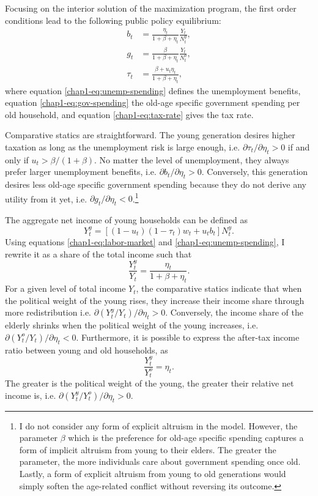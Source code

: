 Focusing on the interior solution of the maximization program, the first order conditions lead to the following public policy equilibrium:
\begin{align}
    b_t &= \frac{\eta_t}{1+\beta+\eta_t}\frac{Y_t}{N_t^y},\label{chap1-eq:unemp-spending}\\
    g_t &= \frac{\beta}{1+\beta+\eta_t}\frac{Y_t}{N_t^o},\label{chap1-eq:gov-spending}\\
    \tau_t &= \frac{\beta + u_t\eta_t}{1+\beta+\eta_t},\label{chap1-eq:tax-rate}
\end{align}
where equation \eqref{chap1-eq:unemp-spending} defines the unemployment benefits, equation \eqref{chap1-eq:gov-spending} the old-age specific government spending per old household, and equation \eqref{chap1-eq:tax-rate} gives the tax rate. 

Comparative statics are straightforward. The young generation desires higher taxation as long as the unemployment risk is large enough, i.e. $\partial \tau_t/\partial \eta_t > 0$ if and only if $u_t> \beta/(1+\beta)$. No matter the level of unemployment, they always prefer larger unemployment benefits, i.e. $\partial b_t/\partial \eta_t > 0$. Conversely, this generation desires less old-age specific government spending because they do not derive any utility from it yet, i.e. $\partial g_t/\partial \eta_t < 0$.\footnote{I do not consider any form of explicit altruism in the model. However, the parameter $\beta$ which is the preference for old-age specific spending captures a form of implicit altruism from young to their elders. The greater the parameter, the more individuals care about government spending once old.  Lastly, a form of explicit altruism from young to old generations would simply soften the age-related conflict without reversing its outcome.}

The aggregate net income of young households can be defined as
\begin{equation*}
    Y_t^y = \left[(1-u_t)(1-\tau_t)w_t + u_tb_t\right]N_t^y.
\end{equation*} Using equations \eqref{chap1-eq:labor-market} and \eqref{chap1-eq:unemp-spending}, I rewrite it as a share of the total income such that 
\begin{equation*}
    \frac{Y_t^y}{Y_t} = \frac{\eta_t}{1+\beta + \eta_t}.
\end{equation*}
For a given level of total income $Y_t$, the comparative statics indicate that when the political weight of the young rises, they increase their income share through more redistribution i.e. $\partial(Y_t^y/Y_t)/\partial\eta_t>0$. Conversely, the income share of the elderly shrinks when the political weight of the young increases, i.e. $\partial(Y_t^o/Y_t)/\partial\eta_t<0$. Furthermore, it is possible to express the after-tax income ratio between young and old households, as 
\begin{equation} \label{chap1-eq:after-tax-income-ratio}
	\frac{Y_t^y}{Y_t^o} = \eta_t.
\end{equation}
The greater is the political weight of the young, the greater their relative net income is, i.e. $\partial(Y_t^y/Y_t^o)/\partial\eta_t>0$.

